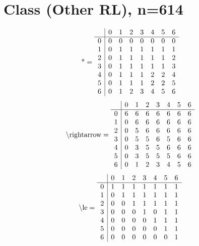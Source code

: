 \documentclass[11pt]{article}
\begin{document}
\section{Class (Other RL), n=614}
\[\text{*} = 
\begin{array}{r | r r r r r r r}
 & 0 & 1 & 2 & 3 & 4 & 5 & 6 \\ \hline
0 & 0 & 0 & 0 & 0 & 0 & 0 & 0 \\
1 & 0 & 1 & 1 & 1 & 1 & 1 & 1 \\
2 & 0 & 1 & 1 & 1 & 1 & 1 & 2 \\
3 & 0 & 1 & 1 & 1 & 1 & 1 & 3 \\
4 & 0 & 1 & 1 & 1 & 2 & 2 & 4 \\
5 & 0 & 1 & 1 & 1 & 2 & 2 & 5 \\
6 & 0 & 1 & 2 & 3 & 4 & 5 & 6 \\
\end{array}
\]
\[\text{\textbackslash rightarrow} = 
\begin{array}{r | r r r r r r r}
 & 0 & 1 & 2 & 3 & 4 & 5 & 6 \\ \hline
0 & 6 & 6 & 6 & 6 & 6 & 6 & 6 \\
1 & 0 & 6 & 6 & 6 & 6 & 6 & 6 \\
2 & 0 & 5 & 6 & 6 & 6 & 6 & 6 \\
3 & 0 & 5 & 5 & 6 & 5 & 6 & 6 \\
4 & 0 & 3 & 5 & 5 & 6 & 6 & 6 \\
5 & 0 & 3 & 5 & 5 & 5 & 6 & 6 \\
6 & 0 & 1 & 2 & 3 & 4 & 5 & 6 \\
\end{array}
\]
\[\text{\textbackslash le} = 
\begin{array}{r | r r r r r r r}
 & 0 & 1 & 2 & 3 & 4 & 5 & 6 \\ \hline
0 & 1 & 1 & 1 & 1 & 1 & 1 & 1 \\
1 & 0 & 1 & 1 & 1 & 1 & 1 & 1 \\
2 & 0 & 0 & 1 & 1 & 1 & 1 & 1 \\
3 & 0 & 0 & 0 & 1 & 0 & 1 & 1 \\
4 & 0 & 0 & 0 & 0 & 1 & 1 & 1 \\
5 & 0 & 0 & 0 & 0 & 0 & 1 & 1 \\
6 & 0 & 0 & 0 & 0 & 0 & 0 & 1 \\
\end{array}
\]
\end{document}
